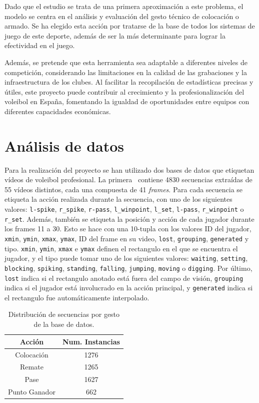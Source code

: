 \documentclass[12pt]{report} %
\begin{document}
    Dado que el estudio se trata de una primera aproximación a este problema,
    el modelo se centra en el análisis y evaluación del gesto técnico de
    colocación o armado. Se ha elegido esta acción por tratarse de la base de
    todos los sistemas de juego de este deporte, además de ser la más
    determinante para lograr la efectividad en el juego.

    Además, se pretende que esta herramienta sea adaptable a diferentes niveles de
    competición, considerando las limitaciones en la calidad de las grabaciones y
    la infraestructura de los clubes. Al facilitar la recopilación de estadísticas
    precisas y útiles, este proyecto puede contribuir al crecimiento y la
    profesionalización del voleibol en España, fomentando la igualdad de
    oportunidades entre equipos con diferentes capacidades económicas.


    \chapter{Análisis de datos}
    \label{cahp:datos}
    Para la realización del proyecto se han utilizado dos bases de datos que
    etiquetan vídeos de voleibol profesional. La primera~\cite{dataset1} contiene 4830
    secuencias extraídas de 55 vídeos distintos, cada una compuesta de 41
    \textit{frames}. Para cada secuencia se etiqueta la acción realizada durante
    la secuencia, con uno de los siguientes valores: \verb!l-spike!,
    \verb!r_spike!, \verb!r-pass!, \verb!l_winpoint!, \verb!l_set!,
    \verb!l-pass!, \verb!r_winpoint! o \verb!r_set!. Además, también se etiqueta
    la posición y acción de cada jugador durante los frames 11 a 30. Esto se
    hace con una 10-tupla con los valores ID del jugador, \verb!xmin!,
    \verb!ymin!, \verb!xmax!, \verb!ymax!, ID del frame en su video,
    \verb!lost!, \verb!grouping!, \verb!generated! y tipo. \verb!xmin!,
    \verb!ymin!, \verb!xmax! e \verb!ymax! definen el rectangulo en el que se
    encuentra el jugador, y el tipo puede tomar uno de los siguientes valores:
    \verb!waiting!, \verb!setting!, \verb!blocking!, \verb!spiking!,
    \verb!standing!, \verb!falling!, \verb!jumping!, \verb!moving! o
    \verb!digging!. Por último, \verb!lost! indica si el rectangulo anotado está
    fuera del campo de visión, \verb!grouping! indica si el jugador está
    involucrado en la acción principal, y \verb!generated! indica si el
    rectangulo fue automáticamente interpolado.

    \begin{table}[H]
        \begin{tabular}{@{}cc@{}}
            \toprule
            Acción & Num. Instancias\\
            \midrule
            Colocación    & 1276\\
            Remate        & 1265\\
            Pase          & 1627\\
            Punto Ganador &  662\\
            \bottomrule
        \end{tabular}
        \caption{Distribución de secuencias por gesto de la base de datos.}
    \end{table}
\end{document}
